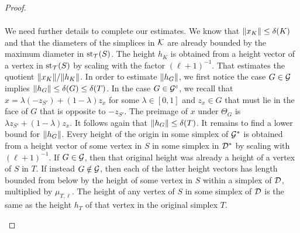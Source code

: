 \documentclass[10pt,a4paper]{article}
\begin{document}
\begin{proof}
\begin{itemize}
\begin{align*}
        \end{align*}
        We need further details to complete our estimates. 
        We know that $\|  x_K  \| \leq {\delta}(K)$ and that the diameters of the simplices in ${\mathcal K}$ are already bounded by the maximum diameter in $\operatorname{st}_{{\mathcal T}}(S)$. The height $h_{K}$ is obtained from a height vector of a vertex in $\operatorname{st}_{{\mathcal T}}(S)$ by scaling with the factor $(\ell+1)^{-1}$.
        That estimates the quotient $\|  x_K  \| / \|  h_K  \|$. 
        In order to estimate $\|  h_{G}  \|$, we first notice the case $G \in {\mathcal G}$ implies $\|  h_{G}  \| \leq {\delta}(G) \leq {\delta}(T)$. 
        In the case $G \in {\mathcal G}^{c}$, we recall that $x = \lambda (-z_{S'}) + (1-\lambda) z_{x}$ for some $\lambda \in [0,1]$ and $z_{x} \in G$
        that must lie in the face of $G$ that is opposite to $-z_{S'}$. 
        The preimage of $x$ under $\Theta_{{G}}$ is $\lambda z_{S'} + (1-\lambda) z_{x}$. 
        It follows again that $\|  h_{G}  \| \leq {\delta}(T)$. 
        It remains to find a lower bound for $\|  h_{G}  \|$.
        Every height of the origin in some simplex of ${\mathcal G}^\ast$ is obtained from a height vector of some vertex in $S$ in some simplex in ${\mathcal D}^\ast$
        by scaling with $(\ell+1)^{-1}$. If $G \in {\mathcal G}$, then that original height was already a height of a vertex of $S$ in $T$. 
        If instead $G \notin {\mathcal G}$, then each of the latter height vectors has length bounded from below by the height of some vertex in $S$ within a simplex of ${\mathcal D}$, multiplied by $\mu_{T,\ell}$. The height of any vertex of $S$ in some simplex of ${\mathcal D}$ is the same as the height $h_T$ of that vertex in the original simplex $T$. 

\end{itemize}
\end{proof}
\end{document}
